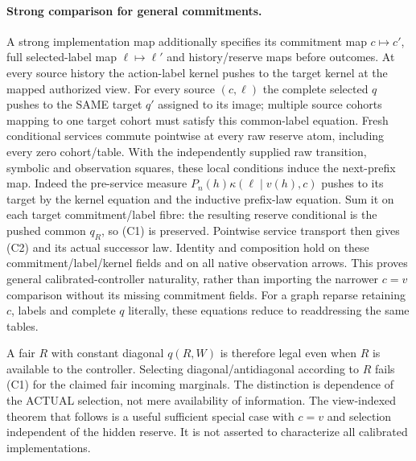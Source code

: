 \documentclass{article}
\begin{document}
\paragraph{Strong comparison for general commitments.}
A strong implementation map additionally specifies its commitment map $c\mapsto c\prime$, full selected-label map $\ell\mapsto\ell\prime$ and history/reserve maps before outcomes. At every source history the action-label kernel pushes to the target kernel at the mapped authorized view. For every source $(c,\ell)$ the complete selected $q$ pushes to the SAME target $q\prime$ assigned to its image; multiple source cohorts mapping to one target cohort must satisfy this common-label equation. Fresh conditional services commute pointwise at every raw reserve atom, including every zero cohort/table. With the independently supplied raw transition, symbolic and observation squares, these local conditions induce the next-prefix map. Indeed the pre-service measure $P_n(h)\kappa(\ell\mid v(h),c)$ pushes to its target by the kernel equation and the inductive prefix-law equation. Sum it on each target commitment/label fibre: the resulting reserve conditional is the pushed common $q_R$, so (C1) is preserved. Pointwise service transport then gives (C2) and its actual successor law. Identity and composition hold on these commitment/label/kernel fields and on all native observation arrows. This proves general calibrated-controller naturality, rather than importing the narrower $c=v$ comparison without its missing commitment fields. For a graph reparse retaining $c$, labels and complete $q$ literally, these equations reduce to readdressing the same tables.

A fair $R$ with constant diagonal $q(R,W)$ is therefore legal even when $R$ is available to the controller. Selecting diagonal/antidiagonal according to $R$ fails (C1) for the claimed fair incoming marginals. The distinction is dependence of the ACTUAL selection, not mere availability of information. The view-indexed theorem that follows is a useful sufficient special case with $c=v$ and selection independent of the hidden reserve. It is not asserted to characterize all calibrated implementations.
\end{document}
